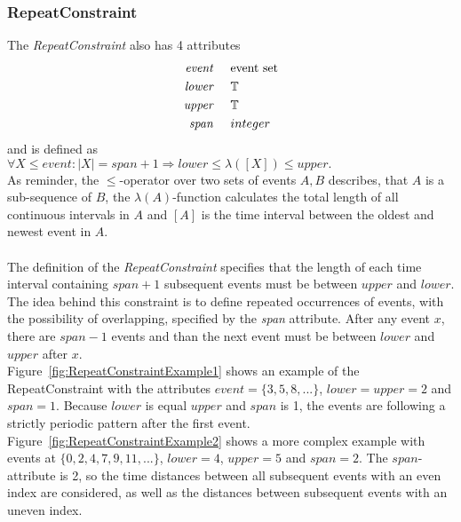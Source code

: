 	\subsubsection{RepeatConstraint}
		The \emph{RepeatConstraint} also has 4 attributes
		\begin{align*}
			\emph{event} & \hspace{.5cm}\text{event set}\\
			\emph{lower} & \hspace{.5cm}\text{$\mathbb{T}$}\\
			\emph{upper} & \hspace{.5cm}\text{$\mathbb{T}$}\\
			\emph{span}	 & \hspace{.5cm}\text{$integer$}\\
		\end{align*}
		and is defined as\\[10pt]
		\begin{math}
			\forall X\leq event: |X|=span+1\Rightarrow lower \leq \lambda([X])\leq upper.
		\end{math}\\[10pt]
		As reminder, the $\leq$-operator over two sets of events $A, B$ describes, that $A$ is a sub-sequence of $B$, the $\lambda(A)$-function calculates the total length of all continuous intervals in $A$ and $[A]$ is the time interval between the oldest and newest event in $A$.\\ \\
		The definition of the \textit{RepeatConstraint} specifies that the length of each time interval containing $span+1$ subsequent events must be between $upper$ and $lower$.\\
		The idea behind this constraint is to define repeated occurrences of events, with the possibility of overlapping, specified by the \emph{span} attribute. After any event $x$, there are $span-1$ events and than the next event must be between $lower$ and $upper$ after $x$.\\
		Figure~\ref{fig:RepeatConstraintExample1} shows an example of the RepeatConstraint with the attributes $event=\{3,5,8,...\}$, $lower=upper=2$ and $span=1$. Because $lower$ is equal $upper$ and $span$ is 1, the events are following a strictly periodic pattern after the first event. Figure~\ref{fig:RepeatConstraintExample2} shows a more complex example with events at $\{0, 2, 4, 7, 9, 11,...\}$, $lower=4$, $upper=5$ and $span=2$. The $span$-attribute is 2, so the time distances between all subsequent events with an even index are considered, as well as the distances between subsequent events with an uneven index. 
		
